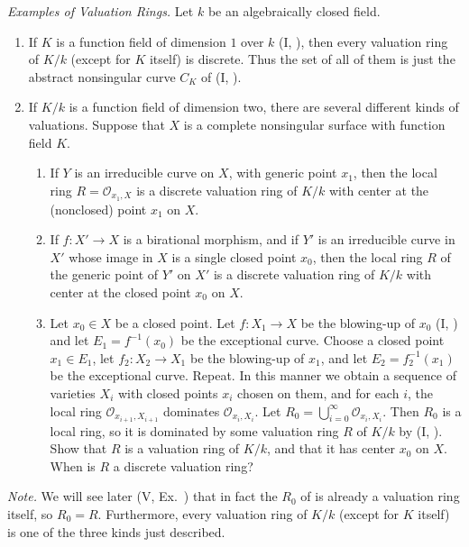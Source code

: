 {{\begin{description}[leftmargin=2.4em,labelindent=0pt,topsep=4pt,itemsep=4pt,parsep=0pt]
\item[\hypertarget{ex-II-4.12}{}\textbf{4.12.}] \emph{Examples of Valuation Rings.} Let $k$ be an algebraically closed field.
\begin{enumerate}[label=(\alph*),leftmargin=1.6em,nosep]
\item If $K$ is a function field of dimension $1$ over $k$ (I, ), then every valuation ring of $K/k$ (except for $K$ itself) is discrete. Thus the set of all of them is just the abstract nonsingular curve $C_K$ of (I, ).
\item If $K/k$ is a function field of dimension two, there are several different kinds of valuations. Suppose that $X$ is a complete nonsingular surface with function field $K$.
\begin{enumerate}[label=(\arabic*),leftmargin=1.6em,nosep]
\item If $Y$ is an irreducible curve on $X$, with generic point $x_1$, then the local ring $R=\mathcal O_{x_1,X}$ is a discrete valuation ring of $K/k$ with center at the (nonclosed) point $x_1$ on $X$.
\item If $f\colon X'\to X$ is a birational morphism\EditionText{}, and if $Y'$ is an irreducible curve in $X'$ whose image in $X$ is a single closed point $x_0$, then \hypertarget{err-II-4-12b2}{}\EditionText{}the local ring $R$ of the generic point of $Y'$ on $X'$ is a discrete valuation ring of $K/k$ with center at the closed point $x_0$ on $X$.
\item[\hypertarget{ex-II-4.12b3}{}(3)] Let $x_0\in X$ be a closed point. Let $f\colon X_1\to X$ be the blowing-up of $x_0$ (I, ) and let $E_1=f^{-1}(x_0)$ be the exceptional curve. Choose a closed point $x_1\in E_1$, let $f_2\colon X_2\to X_1$ be the blowing-up of $x_1$, and let $E_2=f_2^{-1}(x_1)$ be the exceptional curve. Repeat. In this manner we obtain a sequence of varieties $X_i$ with closed points $x_i$ chosen on them, and for each $i$, the local ring $\mathcal O_{x_{i+1},X_{i+1}}$ dominates $\mathcal O_{x_i,X_i}$. Let $R_0=\bigcup_{i=0}^{\infty}\mathcal O_{x_i,X_i}$. Then $R_0$ is a local ring, so it is dominated by some valuation ring $R$ of $K/k$ by (I, ). Show that $R$ is a valuation ring of $K/k$, and that it has center $x_0$ on $X$. When is $R$ a discrete valuation ring?
\end{enumerate}
\end{enumerate}
\emph{Note.} We will see later (V, Ex.~) that in fact the $R_0$ of  is already a valuation ring itself, so $R_0=R$. Furthermore, every valuation ring of $K/k$ (except for $K$ itself) is one of the three kinds just described.
\end{description}}

}
